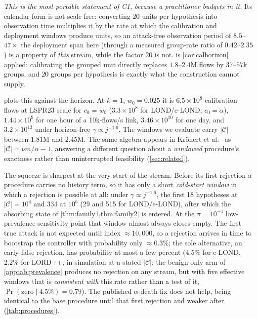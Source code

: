 \documentclass[conference]{IEEEtran}
\newcommand{\Cal}{\mathcal{C}}
\newcommand{\nCal}{\lvert\Cal\rvert}
\begin{document}
\emph{This is the most portable statement of C1, because a practitioner budgets in it.} Its calendar
form is not scale-free: converting $20$ units per hypothesis into observation time multiplies it by
the rate at which the calibration and deployment windows produce units, so an attack-free observation
period of $8.5$--$47\times$ the deployment span here (through a measured group-rate ratio of
$0.42$--$2.35$) is a property of \emph{this} stream, while the factor $20$ is not.
 is \cref{cor:calhorizon} applied: calibrating the grouped unit directly replaces
$1.8$--$2.4$M flows by $37$--$57$k groups, and $20$ groups per hypothesis is exactly what the
construction cannot supply.

 plots this against the horizon. At $k=1$, $w_0 = 0.025$ it is
$6.5\times10^{8}$ calibration flows at LSPR23 scale for $c_0 = w_0$ ($3.3\times10^{8}$ for
LOND/e-LOND, $c_0=\alpha$),
$1.44\times10^{9}$ for one hour of a 10k-flows/s link, $3.46\times10^{10}$ for one day,
and $3.2\times10^{13}$ under horizon-free $\gamma \propto j^{-1.6}$. The windows we evaluate carry
$\nCal$ between $1.81$M and $2.45$M. The same algebra appears in Krönert et
al.~\cite{kronert2024fdr} as $\nCal = \nu m/\alpha - 1$, answering a different question about a
\emph{windowed} procedure's exactness rather than uninterrupted feasibility (\cref{sec:related}).

The squeeze is sharpest at the very start of the stream. Before its first rejection a procedure carries
no history term, so it has only a short \emph{cold-start window} in which a rejection is possible at
all: under $\gamma \propto j^{-1.6}$, the first 18 hypotheses at $\nCal = 10^4$ and 334 at $10^6$ (29 and
515 for LOND/e-LOND), after which the absorbing state of \cref{thm:family1,thm:family2} is entered. At
the $\pi = 10^{-4}$ low-prevalence sensitivity point that window almost always closes empty. The
first true attack is not expected until
index $\approx\!10{,}000$, so a rejection arrives in time to bootstrap the controller with probability
only $\approx\!0.3\%$; the sole alternative, an early false rejection, has probability at most a few
percent ($4.5\%$ for e-LOND, $2.2\%$ for LORD++, in simulation at a stated $\nCal$; the
benign-only arm of \cref{apptab:prevalence} produces no rejection on any stream, but with five
effective windows that is \emph{consistent with} this rate rather than a test of it,
$\Pr(\text{zero}\mid 4.5\%)=0.79$). The published
$\alpha$-death fix does not help, being identical to the base procedure until that first rejection and
weaker after (\cref{tab:procedures}).
\end{document}
